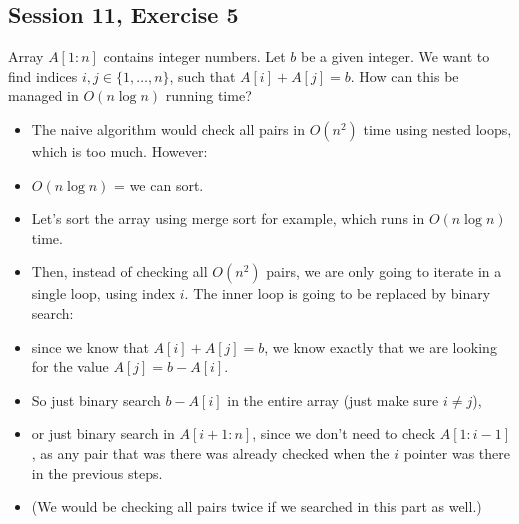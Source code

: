 \subsection {Session 11, Exercise 5}


Array $A[1:n]$ contains integer numbers. Let $b$ be a given integer. We want to find indices $i,j\in{} \{1,\dots{},n\}$, such that $A[i] + A[j] = b$. How can this be managed in $O(n\log{}n)$ running time?


\begin{itemize}
    \item The naive algorithm would check all pairs in $O(n^2)$ time using nested loops, which is too much. However:
    \item $O(n\log{}n)$ = we can sort.
    \item Let's sort the array using merge sort for example, which runs in $O(n\log{}n)$ time.
    \item Then, instead of checking all $O(n^2)$ pairs, we are only going to iterate in a single loop, using index $i$. The inner loop is going to be replaced by binary search:
    \item since we know that $A[i] + A[j] = b$, we know exactly that we are looking for the value $A[j] = b-A[i]$.
    \item So just binary search $b-A[i]$ in the entire array (just make sure $i\neq{}j$),
    \item or just binary search in $A[i+1:n]$, since we don't need to check $A[1:i-1]$, as any pair that was there was already checked when the $i$ pointer was there in the previous steps.
    \item (We would be checking all pairs twice if we searched in this part as well.)
\end{itemize}
